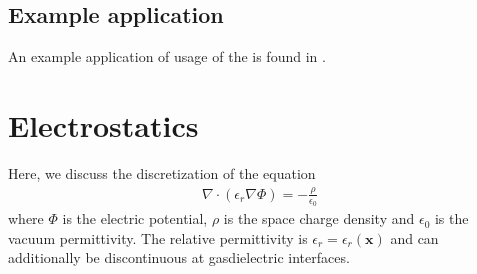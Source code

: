 \documentclass[letterpaper,10pt,english]{sphinxmanual}
\begin{document}
\begin{sphinxVerbatim}[commandchars=\\\{\},formatcom=\scriptsize]
   
          

   
                   
        
         
\end{sphinxVerbatim}


\subsection{Example application}
\label{\detokenize{Solvers/CDR:example-application}}
\sphinxAtStartPar
An example application of usage of the  is found in {\hyperref[\detokenize{Applications/AdvectionDiffusionModel:chap-advectiondiffusionmodel}]{}}.

\sphinxstepscope


\section{Electrostatics}
\label{\detokenize{Solvers/Electrostatics:electrostatics}}\label{\detokenize{Solvers/Electrostatics:chap-electrostatics}}\label{\detokenize{Solvers/Electrostatics::doc}}
\sphinxAtStartPar
Here, we discuss the discretization of the equation
\begin{equation}\label{equation:Solvers/Electrostatics:Poisson}
\begin{split}\nabla\cdot\left(\epsilon_r\nabla\Phi\right) = -\frac{\rho}{\epsilon_0}\end{split}
\end{equation}
\sphinxAtStartPar
where \(\Phi\) is the electric potential, \(\rho\) is the space charge density and \(\epsilon_0\) is the vacuum permittivity.
The relative permittivity is \(\epsilon_r = \epsilon_r\left(\mathbf{x}\right)\) and can additionally be discontinuous at gas\sphinxhyphen{}dielectric interfaces.
\end{document}
